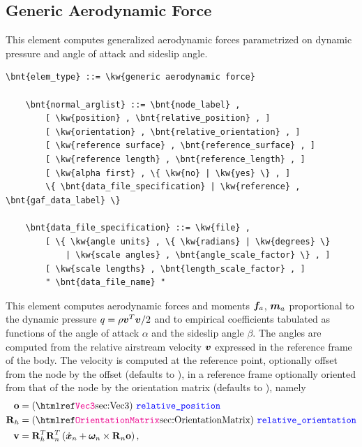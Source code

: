 \subsection{Generic Aerodynamic Force}
\label{sec:EL:AERO:GAF}
This element computes generalized aerodynamic forces parametrized
on dynamic pressure and angle of attack and sideslip angle.
\begin{Verbatim}[commandchars=\\\{\}]
    \bnt{elem_type} ::= \kw{generic aerodynamic force}

    \bnt{normal_arglist} ::= \bnt{node_label} ,
        [ \kw{position} , \bnt{relative_position} , ]
        [ \kw{orientation} , \bnt{relative_orientation} , ]
        [ \kw{reference surface} , \bnt{reference_surface} , ]
        [ \kw{reference length} , \bnt{reference_length} , ]
        [ \kw{alpha first} , \{ \kw{no} | \kw{yes} \} , ]
        \{ \bnt{data_file_specification} | \kw{reference} , \bnt{gaf_data_label} \}

    \bnt{data_file_specification} ::= \kw{file} ,
        [ \{ \kw{angle units} , \{ \kw{radians} | \kw{degrees} \}
            | \kw{scale angles} , \bnt{angle_scale_factor} \} , ]
        [ \kw{scale lengths} , \bnt{length_scale_factor} , ]
        " \bnt{data_file_name} "
\end{Verbatim}
This element computes aerodynamic forces and moments $\boldsymbol{f}_a$, $\boldsymbol{m}_a$
proportional to the dynamic pressure $q=\rho \boldsymbol{v}^T \boldsymbol{v}/2$
and to empirical coefficients tabulated as functions
of the angle of attack $\alpha$ and the sideslip angle $\beta$.
The angles are computed from the relative airstream velocity $\boldsymbol{v}$
expressed in the reference frame of the body.
The velocity is computed at the reference point, optionally offset
from the node  by the offset 
(defaults to ), in a reference frame optionally oriented
from that of the node  by the orientation matrix
 (defaults to ), namely
\begin{subequations}
\begin{align}
	\TT{o} &= \text{(\hty{Vec3})} \ \nt{relative\_position}
	\\
	\TT{R}_h &= \text{(\hty{OrientationMatrix})}\ \nt{relative\_orientation}
	\\
	\TT{v} &= \TT{R}_h^T \TT{R}_n^T \plbr{
		\dot{\T{x}}_n + \T{\omega}_n \times \TT{R}_n \TT{o}
	}
	,
\end{align}
\end{subequations}
